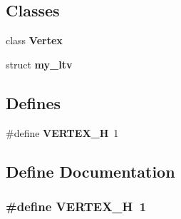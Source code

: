 \subsection*{Classes}
\begin{CompactItemize}
\item 
class {\bf Vertex}
\item 
struct {\bf my\_\-ltv}
\end{CompactItemize}
\subsection*{Defines}
\begin{CompactItemize}
\item 
\#define {\bf VERTEX\_\-H}~1
\end{CompactItemize}


\subsection{Define Documentation}
\subsubsection{\setlength{\rightskip}{0pt plus 5cm}\#define VERTEX\_\-H~1}\label{vertex_8h_e07cbab90525c5082e1bf64da4fe90e6}


